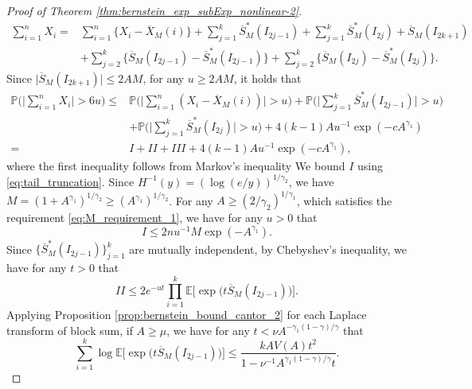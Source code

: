 \documentclass[11pt]{article}
\theoremstyle{plain}
\theoremstyle{definition}
\begin{document}
\begin{proof}[Proof of Theorem \ref{thm:bernstein_exp_subExp_nonlinear-2}]
\begin{equation}\label{eq:decomp_odd_even_coup}
\begin{aligned}
    \sum_{i = 1}^nX_i =& \sum_{i = 1}^n \{X_i - \overline{X}_M(i)\} + \sum_{j = 1}^k\overline{S}^*_M(I_{2j-1}) + \sum_{j = 1}^k\overline{S}^*_M(I_{2j}) + \overline{S}_M( I_{2k+1})\\
    &+ \sum_{j = 2}^k\big\{\overline{S}_M(I_{2j-1}) - \overline{S}^*_M(I_{2j-1})\big\} + \sum_{j = 2}^k\big\{\overline{S}_M(I_{2j}) - \overline{S}^*_M(I_{2j})\big\}.
\end{aligned}
\end{equation}
Since $\big| \overline{S}_M( I_{2k+1}) \big| \leq 2AM$, for any $u \geq 2AM$, it holds that
\begin{equation}
\begin{aligned}
    \mathbb{P}\Big( \Big|\sum_{i = 1}^nX_i\Big| > 6u \Big)
    \leq& \mathbb{P}\Big( \Big|\sum_{i = 1}^n(X_i - \overline{X}_M(i))\Big| > u \Big) + \mathbb{P}\Big( \Big|\sum_{j = 1}^k\overline{S}^*_M(I_{2j-1})\Big| > u \Big)\\
    &+ \mathbb{P}\Big( \Big|\sum_{j = 1}^k\overline{S}^*_M(I_{2j})\Big| > u \Big) + 4(k-1)Au^{-1}\exp(-cA^{\gamma_1})\\
    =& I + II + III + 4(k-1)Au^{-1}\exp(-cA^{\gamma_1}),
\end{aligned}
\end{equation}
where the first inequality follows from Markov's inequality
We bound $I$ using \eqref{eq:tail_truncation}. Since $H^{-1}(y) = (\log(e/y))^{1/\gamma_2}$, we have $M = (1+A^{\gamma_1})^{1/\gamma_2} \geq (A^{\gamma_1})^{1/\gamma_2}$. For any $A \geq (2/\gamma_2)^{1/\gamma_1}$, which satisfies the requirement \eqref{eq:M_requirement_1}, we have for any $u > 0$ that
\begin{equation*}
    I \leq 2nu^{-1}M\exp(-A^{\gamma_1}).
\end{equation*}
Since $\big\{\overline{S}^*_M(I_{2j-1})\big\}_{j = 1}^k$ are mutually independent, by Chebyshev's inequality, we have for any $t > 0$ that
\begin{equation*}
    II \leq 2e^{-ut}\prod_{i = 1}^k\mathbb{E}\Big[\exp\big(t\overline{S}_M(I_{2j-1})\big)\Big] .
\end{equation*}
Applying Proposition \ref{prop:bernstein_bound_cantor_2} for each Laplace transform of block sum, if $A \geq \mu$, we have for any $t < \nu A^{-\gamma_1(1-\gamma)/\gamma}$ that
\begin{equation*}
    \sum_{i = 1}^k\log\mathbb{E}\Big[\exp\big(t\overline{S}_M(I_{2j-1})\big)\Big] \leq \frac{kAV(A)t^2}{1-\nu^{-1}A^{\gamma_1(1-\gamma)/\gamma}t}.

\end{equation*}
\end{proof}
\end{document}
